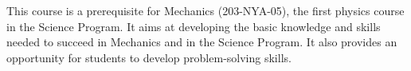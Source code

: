{This course is a prerequisite for Mechanics (203-NYA-05), the first physics course in the Science Program. It aims at developing the basic knowledge and skills needed to succeed in Mechanics and in the Science Program.  It also provides an opportunity for students to develop problem-solving skills.}
